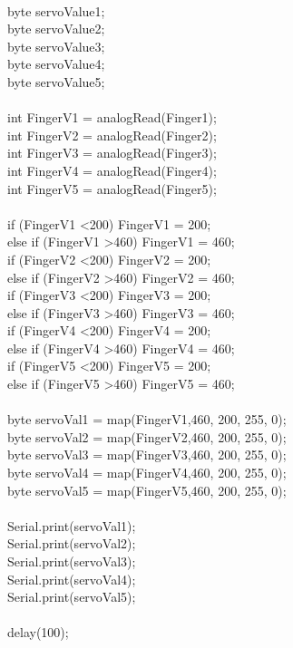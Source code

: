 \documentclass[a4paper, 12pt, notitlepage]{report}
\begin{document}
{\\
byte servoValue1;\\
byte servoValue2;\\
byte servoValue3;\\
byte servoValue4;\\
byte servoValue5;\\
\\
int FingerV1 = analogRead(Finger1);\\
int FingerV2 = analogRead(Finger2);\\
int FingerV3 = analogRead(Finger3);\\
int FingerV4 = analogRead(Finger4);\\
int FingerV5 = analogRead(Finger5);\\
\\
if (FingerV1 \textless 200) FingerV1 = 200;\\
else if (FingerV1 \textgreater 460) FingerV1 = 460;\\
if (FingerV2 \textless 200) FingerV2 = 200;\\
else if (FingerV2 \textgreater 460) FingerV2 = 460;\\
if (FingerV3 \textless 200) FingerV3 = 200;\\
else if (FingerV3 \textgreater 460) FingerV3 = 460;\\ 
if (FingerV4 \textless 200) FingerV4 = 200;\\
else if (FingerV4 \textgreater 460) FingerV4 = 460;\\
if (FingerV5 \textless 200) FingerV5 = 200;\\
else if (FingerV5 \textgreater 460) FingerV5 = 460;\\
\\
byte servoVal1 = map(FingerV1,460, 200, 255, 0);\\
byte servoVal2 = map(FingerV2,460, 200, 255, 0);\\
byte servoVal3 = map(FingerV3,460, 200, 255, 0);\\
byte servoVal4 = map(FingerV4,460, 200, 255, 0);\\
byte servoVal5 = map(FingerV5,460, 200, 255, 0);\\
\\
Serial.print(servoVal1);\\
Serial.print(servoVal2);\\
Serial.print(servoVal3);\\
Serial.print(servoVal4);\\
Serial.print(servoVal5);\\
\\
delay(100);\\
}\\
\end{document}

